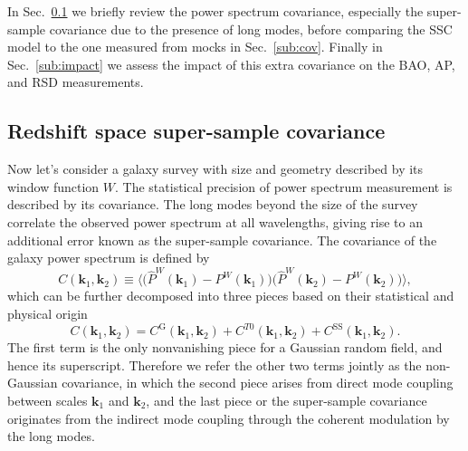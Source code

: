 \documentclass[a4paper,11pt]{article}
\newcommand{\vk}{\mathbf{k}}
\renewcommand{\SS}{\mathrm{SS}}
\newcommand{\Gauss}{\mathrm{G}}
\begin{document}
In Sec.~\ref{sub:ssc} we briefly review  the power spectrum
covariance, especially the super-sample covariance due to the presence of long
modes, before comparing the SSC model to the one measured from mocks in
Sec.~\ref{sub:cov}.
Finally in Sec.~\ref{sub:impact} we assess the impact of this extra covariance
on the BAO, AP, and RSD measurements.



\subsection{Redshift space super-sample covariance}
\label{sub:ssc}

Now let's consider a galaxy survey with size and geometry described by its
window function $W$.
The statistical precision of power spectrum measurement is described by its
covariance.
The long modes beyond the size of the survey correlate the observed power
spectrum at all wavelengths, giving rise to an additional error known as the
super-sample covariance.
The covariance of the galaxy power spectrum is defined by
\begin{equation}
    C(\vk_1,\vk_2) \equiv \bigl\langle \bigl(\hat P^W(\vk_1)-P^W(\vk_1)\bigr)
    \bigl(\hat P^W(\vk_2)-P^W(\vk_2)\bigr) \bigr\rangle,
\end{equation}
which can be further decomposed into three pieces based on their statistical and
physical origin \cite{TakadaHu13}
\begin{equation}
    \label{C}
    C(\vk_1,\vk_2) = C^\Gauss(\vk_1,\vk_2) + C^{T0}(\vk_1,\vk_2) + C^\SS(\vk_1,\vk_2).
\end{equation}
The first term is the only nonvanishing piece for a Gaussian random field, and
hence its superscript.
Therefore we refer the other two terms jointly as the non-Gaussian covariance,
in which the second piece arises from direct mode coupling between scales
$\vk_1$ and $\vk_2$, and the last piece or the super-sample covariance
originates from the indirect mode coupling through the coherent modulation by
the long modes.
\end{document}
